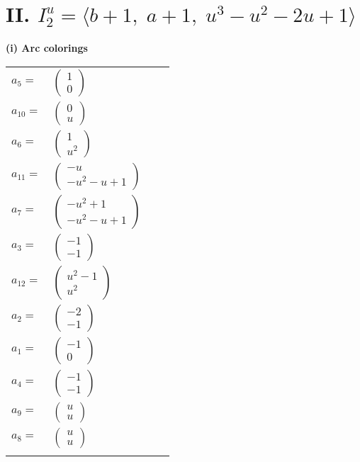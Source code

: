 \documentclass[1p]{elsarticle_modified}
\theoremstyle{definition}
\begin{document}
\centering \section*{II. $I^u_{2}= \langle b+1,\;a+1,\;u^3- u^2-2 u+1 \rangle$}
\flushleft \textbf{(i) Arc colorings}\\
\begin{tabular}{m{7pt} m{180pt} m{7pt} m{180pt} }
\flushright $a_{5}=$&$\begin{pmatrix}1\\0\end{pmatrix}$ \\
\flushright $a_{10}=$&$\begin{pmatrix}0\\u\end{pmatrix}$ \\
\flushright $a_{6}=$&$\begin{pmatrix}1\\u^2\end{pmatrix}$ \\
\flushright $a_{11}=$&$\begin{pmatrix}- u\\- u^2- u+1\end{pmatrix}$ \\
\flushright $a_{7}=$&$\begin{pmatrix}- u^2+1\\- u^2- u+1\end{pmatrix}$ \\
\flushright $a_{3}=$&$\begin{pmatrix}-1\\-1\end{pmatrix}$ \\
\flushright $a_{12}=$&$\begin{pmatrix}u^2-1\\u^2\end{pmatrix}$ \\
\flushright $a_{2}=$&$\begin{pmatrix}-2\\-1\end{pmatrix}$ \\
\flushright $a_{1}=$&$\begin{pmatrix}-1\\0\end{pmatrix}$ \\
\flushright $a_{4}=$&$\begin{pmatrix}-1\\-1\end{pmatrix}$ \\
\flushright $a_{9}=$&$\begin{pmatrix}u\\u\end{pmatrix}$ \\
\flushright $a_{8}=$&$\begin{pmatrix}u\\u\end{pmatrix}$\\&\end{tabular}
\end{document}
